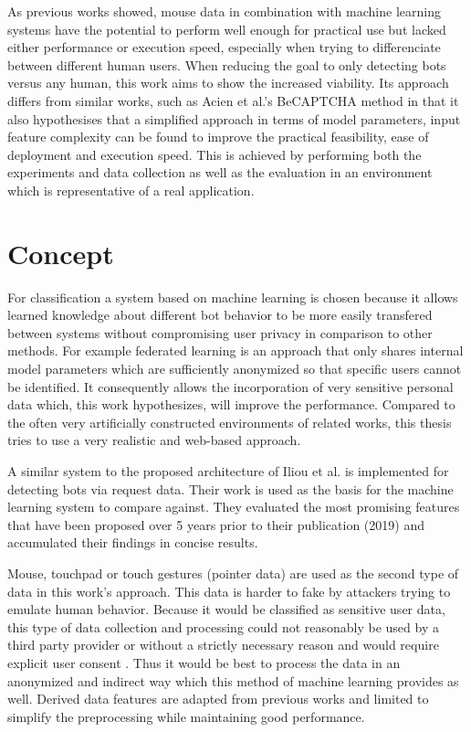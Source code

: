\documentclass[
    fontsize=12pt,
    headings=small,
    parskip=half,           %
    bibliography=totoc,
    numbers=noenddot,       %
    open=any,               %
    final,                   %
    table
]{scrreprt}
\begin{document}
As previous works showed, mouse data in combination with machine learning systems have the potential to perform well enough for practical use but lacked either performance or execution speed, especially when trying to differenciate between different human users. When reducing the goal to only detecting bots versus any human, this work aims to show the increased viability. Its approach differs from similar works, such as Acien et al.'s BeCAPTCHA method \cite{Acien2020BeCAPTCHAMouseSM} in that it also hypothesises that a simplified approach in terms of model parameters, input feature complexity can be found to improve the practical feasibility, ease of deployment and execution speed. This is achieved by performing both the experiments and data collection as well as the evaluation in an environment which is representative of a real application.


\section{Concept}

For classification a system based on machine learning is chosen because it allows learned knowledge about different bot behavior to be more easily transfered between systems without compromising user privacy in comparison to other methods. For example federated learning \cite{DBLP:journals/corr/KonecnyMR15} \cite{DBLP:journals/corr/KonecnyMRR16} is an approach that only shares internal model parameters which are sufficiently anonymized so that specific users cannot be identified. It consequently allows the incorporation of very sensitive personal data which, this work hypothesizes, will improve the performance. Compared to the often very artificially constructed environments of related works, this thesis tries to use a very realistic and web-based approach.

A similar system to the proposed architecture of Iliou et al. \cite{10.1145/3339252.3339267} is implemented for detecting bots via request data. Their work is used as the basis for the machine learning system to compare against. They evaluated the most promising features that have been proposed over 5 years prior to their publication (2019) and accumulated their findings in concise results.

Mouse, touchpad or touch gestures (pointer data) are used as the second type of data in this work's approach. This data is harder to fake by attackers trying to emulate human behavior. Because it would be classified as sensitive user data, this type of data collection and processing could not reasonably be used by a third party provider or without a strictly necessary reason and would require explicit user consent \cite{GDPR}. Thus it would be best to process the data in an anonymized and indirect way which this method of machine learning provides as well. Derived data features are adapted from previous works and limited to simplify the preprocessing while maintaining good performance.
\end{document}
